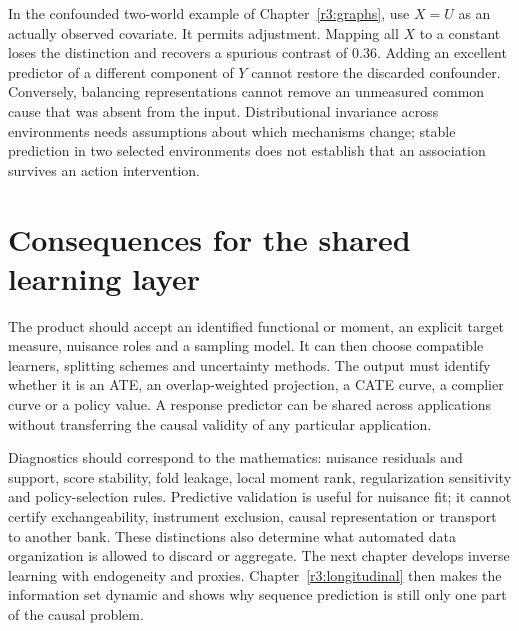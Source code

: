 In the confounded two-world example of Chapter~\ref{r3:graphs}, use
$X=U$ as an actually observed covariate. It permits adjustment. Mapping
all $X$ to a constant loses the distinction and recovers a spurious
contrast of $0.36$. Adding an excellent predictor of a different
component of $Y$ cannot restore the discarded confounder. Conversely,
balancing representations cannot remove an unmeasured common cause
that was absent from the input. Distributional invariance across
environments needs assumptions about which mechanisms change; stable
prediction in two selected environments does not establish that an
association survives an action intervention.

\section{Consequences for the shared learning layer}
\label{r3:ml-contract}
The product should accept an identified functional or moment, an
explicit target measure, nuisance roles and a sampling model. It can then
choose compatible learners, splitting schemes and uncertainty methods.
The output must identify whether it is an ATE, an overlap-weighted
projection, a CATE curve, a complier curve or a policy value. A response
predictor can be shared across applications without transferring the
causal validity of any particular application.

Diagnostics should correspond to the mathematics: nuisance residuals
and support, score stability, fold leakage, local moment rank,
regularization sensitivity and policy-selection rules. Predictive
validation is useful for nuisance fit; it cannot certify exchangeability,
instrument exclusion, causal representation or transport to another bank.
These distinctions also determine what automated data organization is
allowed to discard or aggregate. The next chapter develops inverse
learning with endogeneity and proxies. Chapter~\ref{r3:longitudinal}
then makes the information set dynamic and shows why sequence prediction
is still only one part of the causal problem.

